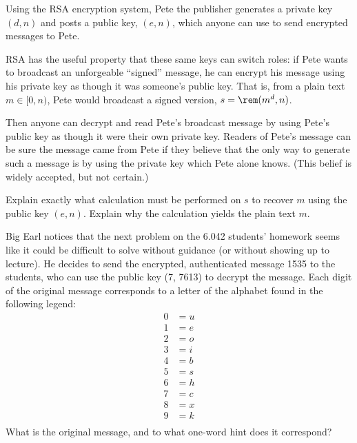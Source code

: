 \documentclass[12pt,twoside]{article}
\begin{document}
\begin{problem}{10}
Using the RSA encryption system, Pete the publisher generates a
private key $(d,n)$ and posts a public key, $(e,n)$, which anyone can
use to send encrypted messages to Pete.

RSA has the useful property that these same keys can switch roles: if
Pete wants to broadcast an unforgeable ``signed'' message, he can
encrypt his message using his private key as though it was someone's
public key.  That is, from a plain text $m \in [0,n)$, Pete would
  broadcast a signed version, $s = \rem(m^d,n)$.

Then anyone can decrypt and read Pete's broadcast message
by using Pete's public key as though it were their own private key.
Readers of Pete's message can be sure the message came from Pete if
they believe that the only way to generate such a message is by using
the private key which Pete alone knows.  (This belief is widely
accepted, but not certain.)
\bparts

\label{sfromm} Explain exactly what calculation must be
performed on $s$ to recover $m$ using the public key $(e,n)$.
Explain why the calculation yields the
plain text $m$.

 Big Earl notices that the next problem on the 6.042 students’ homework seems
like it could be difficult to solve without guidance (or without showing up to lecture). He
decides to send the encrypted, authenticated message 1535 to the students, who can use the
public key (7, 7613) to decrypt the message. Each digit of the original message corresponds
to a letter of the alphabet found in the following legend:
\begin{align*}
    0 &= u \\
    1 &= e \\
    2 &= o \\
    3 &= i \\
    4 &= b \\
    5 &= s \\
    6 &= h \\
    7 &= c \\
    8 &= x \\
    9 &= k \\
\end{align*}
What is the original message, and to what one-word hint does it correspond?

\eparts
\end{problem}
\end{document}
